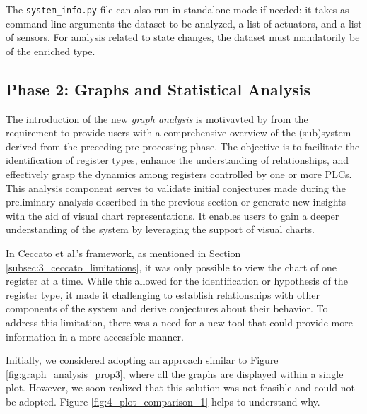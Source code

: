 \bigskip
The \texttt{system\_info.py} file can also run in standalone mode if needed: it takes as command-line arguments the dataset to be analyzed, a list of actuators, and a list of sensors. For analysis related to state changes, the dataset must mandatorily be of the enriched type.

\subsection{Phase 2: Graphs and Statistical Analysis}
\label{subsec:4_improve_graphs}
The introduction of the new \textit{graph analysis} is motivavted by from the requirement to provide users with a comprehensive overview of the (sub)system derived from the preceding pre-processing phase. The objective is to facilitate the identification of register types, enhance the understanding of relationships, and effectively grasp the dynamics among registers controlled by one or more PLCs. This analysis component serves to validate initial conjectures made during the preliminary analysis described in the previous section or generate new insights with the aid of visual chart representations. It enables users to gain a deeper understanding of the system by leveraging the support of visual charts.

\bigskip
In Ceccato et al.'s framework, as mentioned in Section \ref{subsec:3_ceccato_limitations}, it was only possible to view the chart of one register at a time. While this allowed for the identification or hypothesis of the register type, it made it challenging to establish relationships with other components of the system and derive conjectures about their behavior. To address this limitation, there was a need for a new tool that could provide more information in a more accessible manner.

\bigskip
Initially, we considered adopting an approach similar to Figure \ref{fig:graph_analysis_prop3}, where all the graphs are displayed within a single plot. However, we soon realized that this solution was not feasible and could not be adopted. Figure \ref{fig:4_plot_comparison_1} helps to understand why.  

